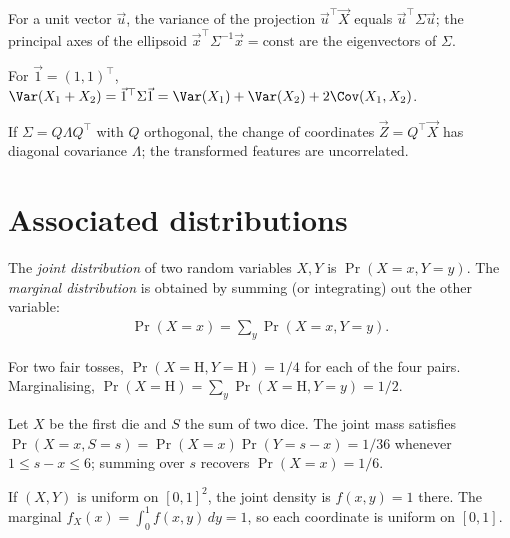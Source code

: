 \documentclass[a4paper, 12pt]{book}
\begin{document}
\begin{example}
    For a unit vector $\vec u$, the variance of the projection $\vec u^\top\vec X$ equals $\vec u^\top\Sigma\vec u$; the principal axes of the ellipsoid $\vec x^\top\Sigma^{-1}\vec x=\mathrm{const}$ are the eigenvectors of $\Sigma$.
\end{example}

\begin{example}
    For $\vec 1=(1,1)^\top$, $\Var(X_1+X_2)=\vec 1^\top\Sigma\vec 1=\Var(X_1)+\Var(X_2)+2\Cov(X_1,X_2)$.
\end{example}

\begin{example}[Diagonalisation]
    If $\Sigma=Q\Lambda Q^\top$ with $Q$ orthogonal, the change of coordinates $\vec Z=Q^\top\vec X$ has diagonal covariance $\Lambda$; the transformed features are uncorrelated.
\end{example}

\section{Associated distributions}

\begin{definition}
    The \emph{joint distribution} of two random variables $X, Y$ is
$\Pr(X = x, Y = y)$. The \emph{marginal distribution} is obtained by summing (or integrating) out the other variable:
\begin{align}
    \Pr(X = x) = \sum_y \Pr(X = x, Y = y).
\end{align}
\end{definition}
\begin{example}
    For two fair tosses, $\Pr(X=\mathrm{H},Y=\mathrm{H})=1/4$ for each of the four pairs. Marginalising, $\Pr(X=\mathrm{H})=\sum_y\Pr(X=\mathrm{H},Y=y)=1/2$.
\end{example}

\begin{example}
    Let $X$ be the first die and $S$ the sum of two dice. The joint mass satisfies $\Pr(X=x,S=s)=\Pr(X=x)\Pr(Y=s-x)=1/36$ whenever $1\leq s-x\leq6$; summing over $s$ recovers $\Pr(X=x)=1/6$.
\end{example}

\begin{example}
    If $(X,Y)$ is uniform on $[0,1]^2$, the joint density is $f(x,y)=1$ there. The marginal $f_X(x)=\int_0^1 f(x,y)\,dy=1$, so each coordinate is uniform on $[0,1]$.
\end{example}
\end{document}
